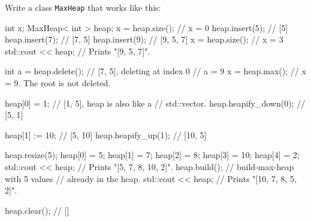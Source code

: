 Write a class \texttt{MaxHeap} that works like this:
\begin{console}
int x;
MaxHeap< int > heap;
x = heap.size();       // x = 0 
heap.insert(5);        // [5]
heap.insert(7);        // [7, 5]
heap.insert(9);        // [9, 5, 7]
x = heap.size();       // x = 3
std::cout << heap;     // Prints "[9, 5, 7]".

int a = heap.delete(); // [7, 5], deleting at index 0
                       // a = 9
x = heap.max();        // x = 9. The root is not deleted.

heap[0] = 1;           // [1, 5], heap is also like a
                       // std::vector.
heap.heapify_down(0);  // [5, 1]

heap[1] := 10;         // [5, 10]
heap.heapify_up(1);    // [10, 5]

heap.resize(5);
heap[0] = 5;
heap[1] = 7;
heap[2] = 8;
heap[3] = 10;
heap[4] = 2;
std::cout << heap;     // Prints "[5, 7, 8, 10, 2]".
heap.build();          // build-max-heap with 5 values
                       // already in the heap.
std::cout << heap;     // Prints "[10, 7, 8, 5, 2]".

heap.clear();          // []
\end{console}
